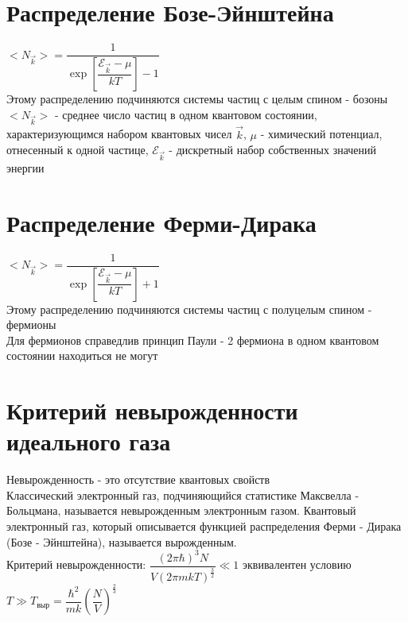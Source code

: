 \begin{multicols*}{2}
		\section{Распределение Бозе-Эйнштейна}
		$<N_{\vec{k}}> = \dfrac{1}{\exp\left[\dfrac{\mathcal{E}_{\vec{k}} - \mu}{kT}\right] - 1}$\\
		Этому распределению подчиняются системы частиц с целым спином - бозоны\\
		$<N_{\vec{k}}>$ - среднее число частиц в одном квантовом состоянии, характеризующимся набором квантовых чисел $\vec{k}$, $\mu$ - химический потенциал, отнесенный к одной частице, $\mathcal{E}_{\vec{k}}$ - дискретный набор собственных значений энергии\\

		\section{Распределение Ферми-Дирака}
		$<N_{\vec{k}}> = \dfrac{1}{\exp\left[\dfrac{\mathcal{E}_{\vec{k}} - \mu}{kT}\right] + 1}$\\
		Этому распределению подчиняются системы частиц с полуцелым спином - фермионы\\
		Для фермионов справедлив принцип Паули - 2 фермиона в одном квантовом состоянии находиться не могут\\

		\section{Критерий невырожденности идеального газа}
		Невырожденность - это отсутствие квантовых свойств\\
		Классический электронный газ, подчиняющийся статистике Максвелла - Больцмана, называется невырожденным электронным газом. Квантовый электронный газ, который описывается функцией распределения Ферми - Дирака (Бозе - Эйнштейна), называется вырожденным.\\
		Критерий невырожденности: $\dfrac{(2\pi \hbar)^3 N}{V(2\pi mkT)^{\frac{3}{2}}} \ll 1$ эквивалентен условию $T\gg T_{\text{выр}} = \dfrac{\hbar^2}{mk} \left(\dfrac{N}{V}\right)^{\frac{2}{3}}$\\


\end{multicols*}
